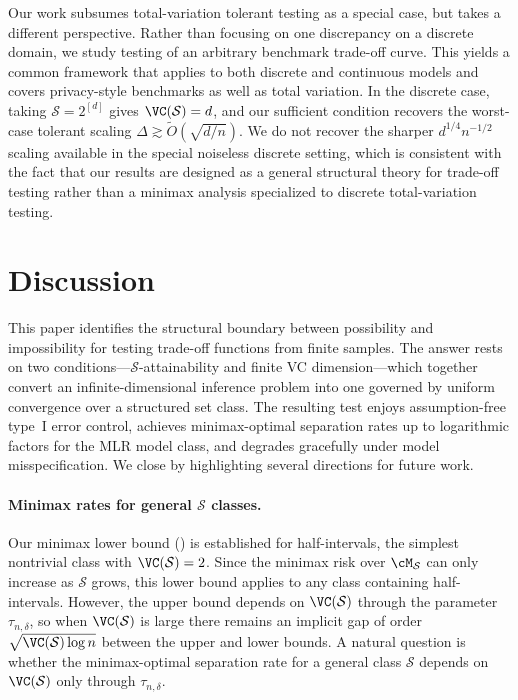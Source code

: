 \documentclass[english]{article}
\theoremstyle{plain}
\theoremstyle{definition}
\newcommand{\tauND}{\tau_{n,\delta}}               %
\begin{document}
Our work subsumes total-variation tolerant testing as a special case, but takes a different perspective. Rather than focusing on one discrepancy on a discrete domain, we study testing of an arbitrary benchmark trade-off curve. This yields a common framework that applies to both discrete and continuous models and covers privacy-style benchmarks as well as total variation. In the discrete case, taking $\mathcal S=2^{[d]}$ gives $\VC(\mathcal S)=d$, and our sufficient condition recovers the worst-case tolerant scaling $\Delta \gtrsim \widetilde O(\sqrt{d/n})$. We do not recover the sharper $d^{1/4}n^{-1/2}$ scaling available in the special noiseless discrete setting, which is consistent with the fact that our results are designed as a general structural theory for trade-off testing rather than a minimax analysis specialized to discrete total-variation testing.














\section{Discussion}\label{sec:discussion}

This paper identifies the structural boundary between possibility and
impossibility for testing trade-off functions from finite samples. 
The answer
rests on two conditions---\(\mathcal{S}\)-attainability and finite VC
dimension---which together convert an infinite-dimensional inference problem
into one governed by uniform convergence over a structured set class. The
resulting test enjoys assumption-free type~I error control, achieves
minimax-optimal separation rates up to logarithmic factors for the MLR model class, and degrades
gracefully under model misspecification. We close by highlighting several
directions for future work.

\paragraph{Minimax rates for general \(\mathcal{S}\) classes.}
Our minimax lower bound () is established for
half-intervals, the simplest nontrivial class with \(\VC(\mathcal{S})=2\).
Since the minimax risk over \(\cM_{\mathcal{S}}\) can only increase as
\(\mathcal{S}\) grows, this lower bound applies to any class containing
half-intervals. However, the upper bound depends on \(\VC(\mathcal{S})\)
through the parameter \(\tauND\), so when \(\VC(\mathcal{S})\) is large there
remains an implicit gap of order
$
\sqrt{\VC(\mathcal{S})\log n}
$
between the upper and lower bounds. A natural question is whether the
minimax-optimal separation rate for a general class \(\mathcal{S}\) depends on
\(\VC(\mathcal{S})\) only through \(\tauND\).
\end{document}
